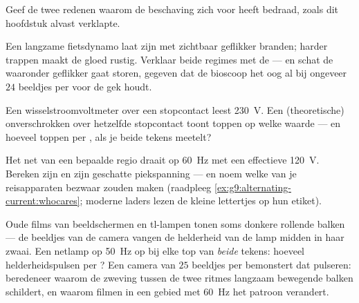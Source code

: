 \begin{exercise}[$\star$]\label{exo:g9:alternating-current:8}
Geef de twee redenen waarom de beschaving zich voor  heeft
bedraad, zoals dit hoofdstuk alvast verklapte.
\end{exercise}

\begin{exercise}[$\star\star$]\label{exo:g9:alternating-current:9}
Een langzame fietsdynamo laat zijn  met zichtbaar geflikker
branden; harder trappen maakt de gloed rustig. Verklaar beide
regimes met de  --- en schat de
 waaronder geflikker gaat storen, gegeven dat de
bioscoop het oog al bij ongeveer $24$ beeldjes per  voor de gek
houdt.
\end{exercise}

\begin{exercise}[$\star\star$]\label{exo:g9:alternating-current:10}
Een wisselstroomvoltmeter over een stopcontact leest
\qty{230}{V}. Een (theoretische) onverschrokken
 over hetzelfde stopcontact toont toppen op welke
waarde --- en hoeveel toppen per , als je beide tekens meetelt?
\end{exercise}

\begin{exercise}[$\star\star$]\label{exo:g9:alternating-current:11}
Het net van een bepaalde regio draait op \qty{60}{Hz} met een
effectieve \qty{120}{V}. Bereken zijn  en zijn
geschatte piekspanning --- en noem welke van je
reisapparaten bezwaar zouden maken (raadpleeg
\cref{ex:g9:alternating-current:whocares}; moderne laders lezen de
kleine lettertjes op hun etiket).
\end{exercise}

\begin{exercise}[$\star\star\star$]\label{exo:g9:alternating-current:12}
Oude films van beeldschermen en tl-lampen tonen soms donkere rollende
balken --- de beeldjes van de camera vangen de helderheid van de lamp
midden in haar zwaai. Een netlamp op \qty{50}{Hz}  op bij elke top
van \emph{beide} tekens: hoeveel helderheidspulsen per ? Een
camera van $25$ beeldjes per  bemonstert dat pulseren: beredeneer
waarom de zweving tussen de twee ritmes langzaam bewegende balken
schildert, en waarom filmen in een gebied met \qty{60}{Hz} het patroon
verandert.
\end{exercise}

